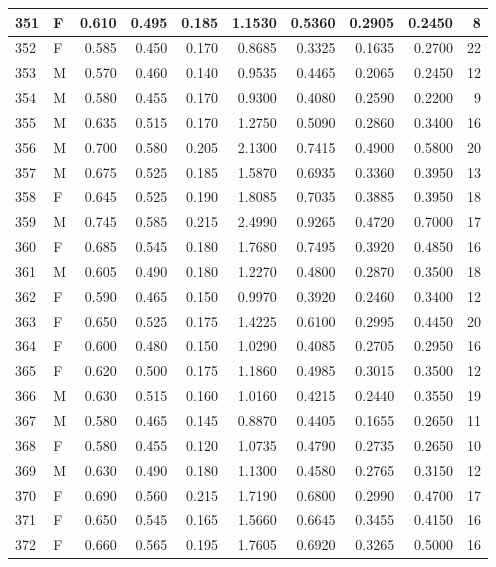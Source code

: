 \documentclass[9pt,twocolumn,twoside,]{pnas-new}
\begin{document}
\begin{tabular}{l|l|r|r|r|r|r|r|r|r}
\hline
351 & F & 0.610 & 0.495 & 0.185 & 1.1530 & 0.5360 & 0.2905 & 0.2450 & 8\\
\hline
352 & F & 0.585 & 0.450 & 0.170 & 0.8685 & 0.3325 & 0.1635 & 0.2700 & 22\\
\hline
353 & M & 0.570 & 0.460 & 0.140 & 0.9535 & 0.4465 & 0.2065 & 0.2450 & 12\\
\hline
354 & M & 0.580 & 0.455 & 0.170 & 0.9300 & 0.4080 & 0.2590 & 0.2200 & 9\\
\hline
355 & M & 0.635 & 0.515 & 0.170 & 1.2750 & 0.5090 & 0.2860 & 0.3400 & 16\\
\hline
356 & M & 0.700 & 0.580 & 0.205 & 2.1300 & 0.7415 & 0.4900 & 0.5800 & 20\\
\hline
357 & M & 0.675 & 0.525 & 0.185 & 1.5870 & 0.6935 & 0.3360 & 0.3950 & 13\\
\hline
358 & F & 0.645 & 0.525 & 0.190 & 1.8085 & 0.7035 & 0.3885 & 0.3950 & 18\\
\hline
359 & M & 0.745 & 0.585 & 0.215 & 2.4990 & 0.9265 & 0.4720 & 0.7000 & 17\\
\hline
360 & F & 0.685 & 0.545 & 0.180 & 1.7680 & 0.7495 & 0.3920 & 0.4850 & 16\\
\hline
361 & M & 0.605 & 0.490 & 0.180 & 1.2270 & 0.4800 & 0.2870 & 0.3500 & 18\\
\hline
362 & F & 0.590 & 0.465 & 0.150 & 0.9970 & 0.3920 & 0.2460 & 0.3400 & 12\\
\hline
363 & F & 0.650 & 0.525 & 0.175 & 1.4225 & 0.6100 & 0.2995 & 0.4450 & 20\\
\hline
364 & F & 0.600 & 0.480 & 0.150 & 1.0290 & 0.4085 & 0.2705 & 0.2950 & 16\\
\hline
365 & F & 0.620 & 0.500 & 0.175 & 1.1860 & 0.4985 & 0.3015 & 0.3500 & 12\\
\hline
366 & M & 0.630 & 0.515 & 0.160 & 1.0160 & 0.4215 & 0.2440 & 0.3550 & 19\\
\hline
367 & M & 0.580 & 0.465 & 0.145 & 0.8870 & 0.4405 & 0.1655 & 0.2650 & 11\\
\hline
368 & F & 0.580 & 0.455 & 0.120 & 1.0735 & 0.4790 & 0.2735 & 0.2650 & 10\\
\hline
369 & M & 0.630 & 0.490 & 0.180 & 1.1300 & 0.4580 & 0.2765 & 0.3150 & 12\\
\hline
370 & F & 0.690 & 0.560 & 0.215 & 1.7190 & 0.6800 & 0.2990 & 0.4700 & 17\\
\hline
371 & F & 0.650 & 0.545 & 0.165 & 1.5660 & 0.6645 & 0.3455 & 0.4150 & 16\\
\hline
372 & F & 0.660 & 0.565 & 0.195 & 1.7605 & 0.6920 & 0.3265 & 0.5000 & 16\\

\end{tabular}
\end{document}
